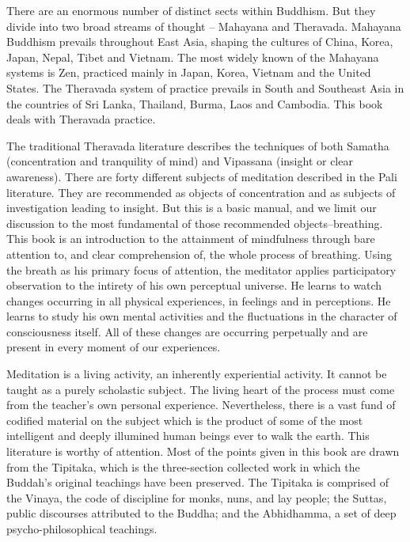 There are an enormous number of distinct sects within Buddhism. But they divide
into two broad streams of thought -- Mahayana and Theravada. Mahayana Buddhism
prevails throughout East Asia, shaping the cultures of China, Korea, Japan,
Nepal, Tibet and Vietnam. The most widely known of the Mahayana systems is Zen,
practiced mainly in Japan, Korea, Vietnam and the United States. The Theravada
system of practice prevails in South and Southeast Asia in the countries of Sri
Lanka, Thailand, Burma, Laos and Cambodia. This book deals with Theravada
practice.

The traditional Theravada literature describes the techniques of both Samatha
(concentration and tranquility of mind) and Vipassana (insight or clear
awareness). There are forty different subjects of meditation described in the
Pali literature. They are recommended as objects of concentration and as
subjects of investigation leading to insight. But this is a basic manual, and we
limit our discussion to the most fundamental of those recommended
objects--breathing. This book is an introduction to the attainment of
mindfulness through bare attention to, and clear comprehension of, the whole
process of breathing. Using the breath as his primary focus of attention, the
meditator applies participatory observation to the intirety of his own
perceptual universe. He learns to watch changes occurring in all physical
experiences, in feelings and in perceptions. He learns to study his own mental
activities and the fluctuations in the character of consciousness itself. All of
these changes are occurring perpetually and are present in every moment of our
experiences.

Meditation is a living activity, an inherently experiential activity. It cannot
be taught as a purely scholastic subject. The living heart of the process must
come from the teacher's own personal experience. Nevertheless, there is a vast
fund of codified material on the subject which is the product of some of the
most intelligent and deeply illumined human beings ever to walk the earth. This
literature is worthy of attention. Most of the points given in this book are
drawn from the Tipitaka, which is the three-section collected work in which the
Buddah's original teachings have been preserved. The Tipitaka is comprised of
the Vinaya, the code of discipline for monks, nuns, and lay people; the Suttas,
public discourses attributed to the Buddha; and the Abhidhamma, a set of deep
psycho-philosophical teachings.

